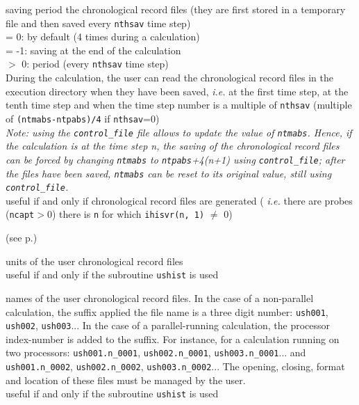 {saving period the chronological record files (they are first stored in a
temporary file and then saved every {\tt nthsav} time step)\\
\hspace*{1.3cm}= 0: by default (4 times during a calculation)\\
\hspace*{1.3cm}= -1: saving at the end of the calculation\\
\hspace*{1.3cm}$>$ 0: period (every {\tt nthsav} time step)\\
During the calculation, the user can read the chronological record files
in the execution directory when they have been saved, {\em i.e.} at the first
time step, at the tenth time step and when the time step number is a multiple of
{\tt nthsav} (multiple of {\tt (ntmabs-ntpabs)/4} if {\tt nthsav}=0)\\
{\em Note: using the \texttt{control\_file} file allows to update the value of
{\tt ntmabs}. Hence, if the calculation is at the time step n, the saving of the
chronological record files can be forced by changing {\tt ntmabs} to
{\tt ntpabs}+4(n+1)
using \texttt{control\_file}; after the files have been saved, {\tt ntmabs} can be
reset to its original value, still using \texttt{control\_file}.}\\
useful if and only if chronological record files are generated ({\em
i.e.} there are probes ({\tt ncapt}$>$0) there is {\tt n} for which
{\tt ihisvr(n, 1)} $\ne$ 0)}

(see p.\pageref{prg_ushist})

{units of the user chronological record files\\
useful if and only if the subroutine \texttt{ushist} is used}

{names of the user chronological record files.
In the case of a non-parallel calculation, the suffix applied the file
name is a three digit number: \texttt{ush001}, \texttt{ush002},
\texttt{ush003}...
In the case of a parallel-running calculation, the processor
index-number is added to the suffix. For instance, for a calculation
running on two processors:  \texttt{ush001.n\_0001},
\texttt{ush002.n\_0001}, \texttt{ush003.n\_0001}... and
\texttt{ush001.n\_0002},
\texttt{ush002.n\_0002}, \texttt{ush003.n\_0002}...
The opening, closing, format and location of these files must be managed
by the user.\\
useful if and only if the subroutine \texttt{ushist} is used}


